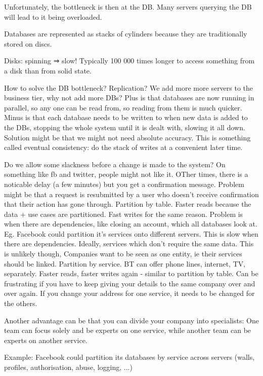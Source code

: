 \documentclass[11pt]{article}
\begin{document}
Unfortunately, the bottleneck is then at the DB. Many servers querying the DB will lead to it being overloaded.

Databases are represented as stacks of cylinders because they are traditionally stored on discs.

Disks: spinning ⇒ slow! Typically 100 000 times longer to access something from a disk than from solid state.

How to solve the DB bottleneck?
Replication? We add more more servers to the business tier, why not add more DBs? Plus is that databases are now running in parallel, so any one can be read from, so reading from them is much quicker. Minus is that each database needs to be written to when new data is added to the DBs, stopping the whole system until it is dealt with, slowing it all down. Solution might be that we might not need absolute accuracy. This is something called eventual consistency: do the stack of writes at a convenient later time.

Do we allow some slackness before a change is made to the system? On something like fb and twitter, people might not like it. OTher times, there is a noticable delay (a few minutes) but you get a confirmation message. Problem might be that a request is resubmitted by a user who doesn’t receive confirmation that their action has gone through.
Partition by table. Faster reads because the data + use cases are partitioned. Fast writes for the same reason. Problem is when there are dependencies, like closing an account, which all databases look at. Eg. Facebook could partition it’s services onto different servers. This is slow when there are dependencies. Ideally, services which don’t require the same data. This is unlikely though, Companies want to be seen as one entity, ie their services should be linked.
Partition by service. BT can offer phone lines, internet, TV, separately. Faster reads, faster writes again - similar to partition by table. Can be frustrating if you have to keep giving your details to the same company over and over again. If you change your address for one service, it needs to be changed for the others. 

Another advantage can be that you can divide your company into specialists: One team can focus solely and be experts on one service, while another team can be experts on another service.

Example: Facebook could partition its databases by service across servers (walls, profiles, authorisation, abuse, logging, ...)
\end{document}
